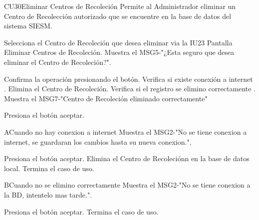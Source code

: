 \begin{UseCase}{CU30}{Eliminar Centros de Recoleción}{
		Permite al Administrador eliminar un Centro de Recolección autorizado que se encuentre en la base de datos del sistema SIESM.\\
}
	
\end{UseCase}



\begin{UCtrayectoria}
	\item\UCactor Selecciona el Centro de Recoleción que desea eliminar via la IU23 Pantalla Eliminar Centros de Recoleción.
	\UCpaso Muestra el MSG5-"¿Esta seguro que desea eliminar el Centro de Recoleción?".
	\item\UCactor Confirma la operación presionando el botón.
	\UCpaso Verifica si existe conexión a internet .
	\UCpaso Elimina el Centro de Recoleción.
	\UCpaso Verifica si el registro se elimino correctamente .
	\UCpaso Muestra el MSG7-"Centro de Recoleción eliminado correctamente"
	\item\UCactor Presiona el botón aceptar.
\end{UCtrayectoria}


\begin{UCtrayectoriaA}{A}{Cuando no hay conexion a internet}
	\UCpaso Muestra el MSG2-"No se tiene conexion a internet, se guardaran los cambios hasta su nueva conexion.".
	\item\UCactor Presiona el botón aceptar.
	\UCpaso Elimina el Centro de Recoleciónn en la base de datos local.	
	\UCpaso[] Termina el caso de uso.
\end{UCtrayectoriaA}

\begin{UCtrayectoriaA}{B}{Cuando no se elimino correctamente}
	\UCpaso Muestra el MSG2-"No se tiene conexion a la BD, intentelo mas tarde.".
	\item\UCactor Presiona el botón aceptar.
	\UCpaso[] Termina el caso de uso.
\end{UCtrayectoriaA}